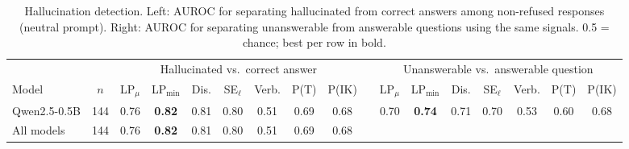 \begin{table}[t]
\centering
\caption{Hallucination detection. Left: AUROC for separating hallucinated from correct answers among non-refused responses (neutral prompt). Right: AUROC for separating unanswerable from answerable questions using the same signals. 0.5 = chance; best per row in bold.}
\label{tab:detection}
\setlength{\tabcolsep}{2.4pt}
\footnotesize
\begin{tabular}{l c ccccccc c ccccccc}
\toprule
 & & \multicolumn{7}{c}{Hallucinated vs.\ correct answer} & & \multicolumn{7}{c}{Unanswerable vs.\ answerable question}\\
\cmidrule(lr){3-9}\cmidrule(lr){11-17}
Model & $n$ & LP$_{\mu}$ & LP$_{\min}$ & Dis. & SE$_{\ell}$ & Verb. & P(T) & P(IK) & & LP$_{\mu}$ & LP$_{\min}$ & Dis. & SE$_{\ell}$ & Verb. & P(T) & P(IK) \\
\midrule
Qwen2.5-0.5B & 144 & 0.76 & \textbf{0.82} & 0.81 & 0.80 & 0.51 & 0.69 & 0.68 & & 0.70 & \textbf{0.74} & 0.71 & 0.70 & 0.53 & 0.60 & 0.68 \\
\midrule
All models & 144 & 0.76 & \textbf{0.82} & 0.81 & 0.80 & 0.51 & 0.69 & 0.68 & &  &  &  &  &  &  &  \\
\bottomrule
\end{tabular}
\end{table}
